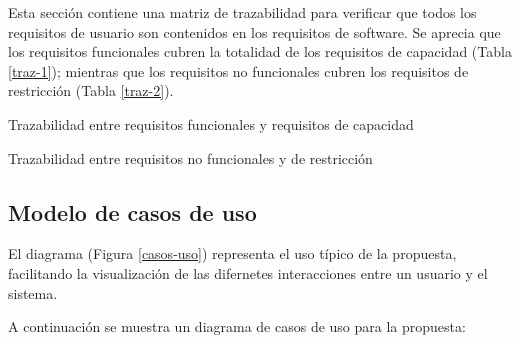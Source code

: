 Esta sección contiene una matriz de trazabilidad para verificar que todos los requisitos de usuario son contenidos en los requisitos de software. Se aprecia que los requisitos funcionales cubren la totalidad de los requisitos de capacidad (Tabla \ref{traz-1}); mientras que los requisitos no funcionales cubren los requisitos de restricción (Tabla \ref{traz-2}).

\begin{table}[H]
    \traceabilityFNCA
    \caption{Trazabilidad entre requisitos funcionales y requisitos de capacidad}
    \label{traz-1}
\end{table}

\begin{table}[H]
    \traceabilityNFRE
    \caption{Trazabilidad entre requisitos no funcionales y de restricción}
    \label{traz-2}
\end{table}

\subsection{Modelo de casos de uso}

El diagrama (Figura \ref{casos-uso}) representa el uso típico de la propuesta, facilitando la visualización de las difernetes interacciones entre un usuario y el sistema. 

\printuctemplate{}

A continuación se muestra un diagrama de casos de uso para la propuesta:

